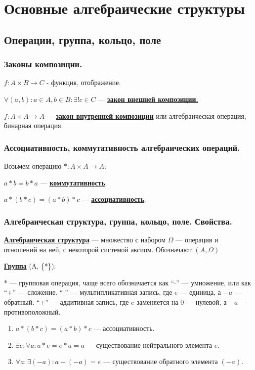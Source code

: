 \documentclass[twoside]{book}
\newcommand{\deff}[1]{\underline{\textbf{#1}}}
\begin{document}
\section{Основные алгебраические структуры}
\subsection{Операции, группа, кольцо, поле}
\subsubsection{Законы композиции.}

$f: A \times B \rightarrow C$ - функция, отображение.

$\forall (a,b): a \in A, b \in B: \exists! c \in C$ --- \deff{закон внешней композиции.}

$f: A \times A \rightarrow A$ --- \deff{закон внутренней композиции} или алгебраическая операция, бинарная операция.

\subsubsection{Ассоциативность, коммутативность алгебраических операций.}

Возьмем операцию $*: A \times A \rightarrow A$:

$a * b = b * a$ --- \deff{коммутативность}.

$a * (b *c) = (a * b) *c$ --- \deff{ассоциативность}.


\subsubsection{Алгебраическая структура, группа, кольцо, поле. Свойства.}

\deff{Алгебраическая структура} --- множество с набором $\Omega$ --- операция и отношений на ней, с некоторой системой аксиом. Обозначают $(A, \Omega)$

\deff{Группа} (A, \{*\}):

* --- групповая операция, чаще всего обозначается как ``$\cdot$'' --- умножение, или как ``$+$'' --- сложение.
``$\cdot$'' --- мультипликативная запись, где $e$ --- единица, а $-a$ --- обратный.
``$+$'' --- аддитивная запись, где $e$ заменяется на $0$ --- нулевой, а $-a$ --- противоположный.

\begin{enumerate}
    \item $a * (b * c) = (a * b) * c$ --- ассоциативность.
    \item $\exists e:\forall a: a * e = e * a = a$ --- существование нейтрального элемента $e$.
    \item $\forall a: \exists (-a): a+ (-a) = e$ --- существование обратного элемента $(-a)$.
\end{enumerate}
\end{document}
